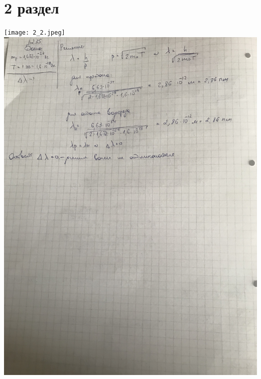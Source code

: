 \documentclass[12pt]{article}
\begin{document}
\section{2 раздел}
\begin{center}
\texttt{[image: 2\_2.jpeg]}\\
\vfill
\includegraphics[scale=0.18]{2_1.jpeg}\\
\end{center}
\end{document}

